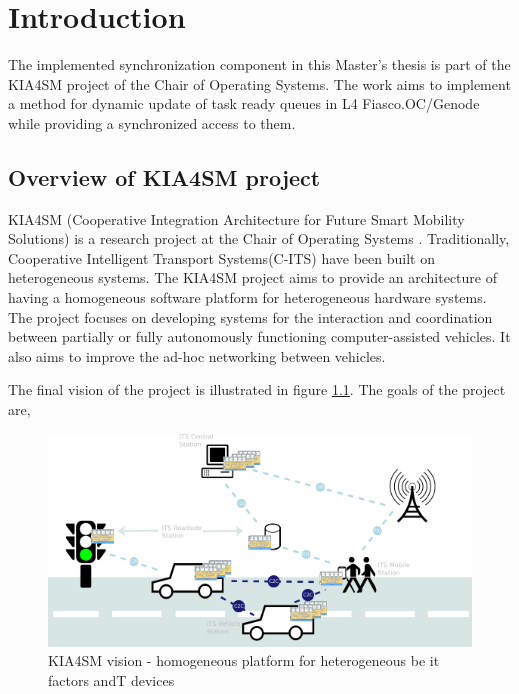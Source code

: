 
\chapter{Introduction}\label{chapter:introduction}

The implemented synchronization component in this Master's thesis is part of the KIA4SM project of the Chair of Operating Systems. The work aims to implement a method for dynamic update of task ready queues in L4 Fiasco.OC/Genode while providing a synchronized access to them.


\section{Overview of KIA4SM project}

KIA4SM (Cooperative Integration Architecture for Future Smart Mobility Solutions) is a research project at the Chair of Operating Systems \cite{kia4sm}. Traditionally, Cooperative Intelligent Transport Systems(C-ITS) have been built on heterogeneous systems. The KIA4SM project aims to provide an architecture of having a homogeneous software platform for heterogeneous hardware systems. The project focuses on developing systems for the interaction and coordination between partially or fully autonomously functioning computer-assisted vehicles. It also aims to improve the ad-hoc networking between vehicles.

The final vision of the project is illustrated in figure \ref{kia4sm}. The goals of the project are,

\begin{figure}[h]
  \centering
  \includegraphics[scale = 0.8]{figures/kia4sm_vision.png}
  \caption{KIA4SM vision - homogeneous platform for heterogeneous be it  factors andT devices \cite{kia4sm}} \label{kia4sm}
\end{figure}

